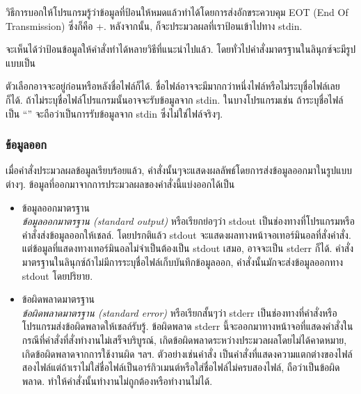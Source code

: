 \begin{thwbr}
\begin{itemize}
\begin{MyExample}
\begin{MyEx}
\end{MyEx}
\end{MyExample}
วิธีการบอกให้โปรแกรมรู้ว่าข้อมูลที่ป้อนให้หมดแล้วทำได้โดยการส่งอักขระควบคุม EOT (End Of Transmission) ซึ่งก็คือ +. หลังจากนั้น,  ก็จะประมวลผลที่เราป้อนเข้าไปทาง stdin.
\end{itemize}

จะเห็นได้ว่าป้อนข้อมูลให้คำสั่งทำได้หลายวิธีที่แนะนำไปแล้ว. โดยทั่วไปคำสั่งมาตรฐานในลินุกซ์จะมีรูปแบบเป็น

ตัวเลือกอาจจะอยู่ก่อนหรือหลังชื่อไฟล์ก็ได้. ชื่อไฟล์อาจจะมีมากกว่าหนึ่งไฟล์หรือไม่ระบุชื่อไฟล์เลยก็ได้. ถ้าไม่ระบุชื่อไฟล์โปรแกรมนั้นอาจจะรับข้อมูลจาก stdin. ในบางโปรแกรมเช่น  ถ้าระบุชื่อไฟล์เป็น ``\cmd{-}'' จะถือว่าเป็นการรับข้อมูลจาก stdin ซึ่งไม่ใช่ไฟล์จริงๆ. 

\subsubsection{ข้อมูลออก}
เมื่อคำสั่งประมวลผลข้อมูลเรียบร้อยแล้ว, คำสั่งนั้นๆจะแสดงผลลัพธ์โดยการส่งข้อมูลออกมาในรูปแบบต่างๆ. ข้อมูลที่ออกมาจากการประมวลผลของคำสั่งนี้แบ่งออกได้เป็น

\begin{itemize}
\item ข้อมูลออกมาตรฐาน\\
\emph{ข้อมูลออกมาตรฐาน (standard output)} หรือเรียกย่อๆว่า stdout เป็นช่องทางที่โปรแกรมหรือคำสั่งส่งข้อมูลออกให้เชลล์. โดยปรกติแล้ว stdout จะแสดงผลทางหน้าจอเทอร์มินอลที่สั่งคำสั่ง. แต่ข้อมูลที่แสดงทางเทอร์มินอลไม่จำเป็นต้องเป็น stdout เสมอ, อาจจะเป็น stderr ก็ได้. คำสั่งมาตรฐานในลินุกซ์ถ้าไม่มีการระบุชื่อไฟล์เก็บบันทึกข้อมูลออก, คำสั่งนั้นมักจะส่งข้อมูลออกทาง stdout โดยปริยาย.
\item ข้อผิดพลาดมาตรฐาน\\
\emph{ข้อผิดพลาดมาตรฐาน (standard error)} หรือเรียกสั้นๆว่า stderr เป็นช่องทางที่คำสั่งหรือโปรแกรมส่งข้อผิดพลาดให้เชลล์รับรู้. ข้อผิดพลาด stderr นี้จะออกมาทางหน้าจอที่แสดงคำสั่งในกรณีที่คำสั่งที่สั่งทำงานไม่เสร็จบริบูรณ์, เกิดข้อผิดพลาดระหว่างประมวลผลโดยไม่ได้คาดหมาย, เกิดข้อผิดพลาดจากการใช้งานผิด ฯลฯ. ตัวอย่างเช่นคำสั่ง  เป็นคำสั่งที่แสดงความแตกต่างของไฟล์สองไฟล์แต่ถ้าเราไม่ใส่ชื่อไฟล์เป็นอาร์กิวเมนต์หรือใส่ชื่อไฟล์ไม่ครบสองไฟล์, ถือว่าเป็นข้อผิดพลาด. ทำให้คำสั่งนั้นทำงานไม่ถูกต้องหรือทำงานไม่ได้.
\begin{MyExample}
\end{MyExample}


\end{itemize}
\end{thwbr}
